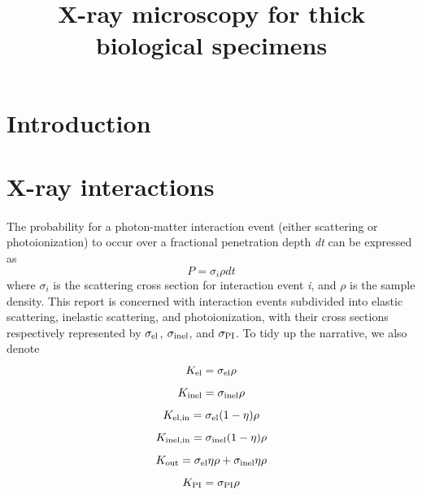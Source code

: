 \documentclass[]{article}
\title{X-ray microscopy for thick biological specimens}
\newcommand\el{\textup{\scriptsize{el}}}
\newcommand\inel{\textup{\scriptsize{inel}}}
\newcommand\elin{\textup{\scriptsize{el,in}}}
\newcommand\inelin{\textup{\scriptsize{inel,in}}}
\newcommand\out{\textup{\scriptsize{out}}}
\newcommand\PI{\textup{\scriptsize{PI}}}
\begin{document}
\maketitle

\begin{abstract}

\end{abstract}

\section{Introduction}

\section{X-ray interactions}

\paragraph{} The probability for a photon-matter interaction event (either scattering or photoionization) to occur over a fractional penetration depth \textit{dt} can be expressed as
\begin{equation}
P = \sigma_{i} \rho dt
\end{equation}
where $\sigma_{i}$ is the scattering cross section for interaction event \textit{i}, and $\rho$ is the sample density. This report is concerned with interaction events subdivided into elastic scattering, inelastic scattering, and photoionization, with their cross sections respectively represented by $\sigma_{\el}$, $\sigma_{\inel}$, and $\sigma_{\PI}$. To tidy up the narrative, we also denote
\begin{equation}
K_{\el} = \sigma_{\el}\rho
\end{equation}
\begin{equation}
K_{\inel} = \sigma_{\inel}\rho
\end{equation}
\begin{equation}
K_{\elin} = \sigma_{\el}(1-\eta)\rho
\end{equation}
\begin{equation}
K_{\inelin} = \sigma_{\inel}(1-\eta)\rho
\label{eq:inelin}
\end{equation}
\begin{equation}
K_{\out} = \sigma_{\el}\eta\rho + \sigma_{\inel}\eta\rho
\end{equation}
\begin{equation}
K_{\PI} = \sigma_{\PI}\rho
\end{equation}
\end{document}
